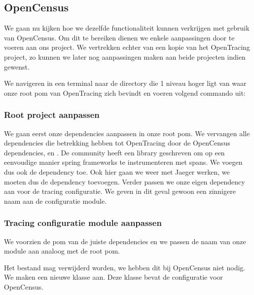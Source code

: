 \subsection{OpenCensus}
We gaan nu kijken hoe we dezelfde functionaliteit kunnen verkrijgen met gebruik van OpenCensus. Om dit te bereiken dienen we enkele aanpassingen door te voeren aan ons project. We vertrekken echter van een kopie van het OpenTracing project, zo kunnen we later nog aanpassingen maken aan beide projecten indien gewenst.

We navigeren in een terminal naar de directory die 1 niveau hoger ligt van waar onze root pom van OpenTracing zich bevindt en voeren volgend commando uit:
\begin{list}{}{}
	\item {}
\end{list}
\subsubsection{Root project aanpassen}
We gaan eerst onze dependencies aanpassen in onze root pom. We vervangen alle dependencies die betrekking hebben tot OpenTracing door de OpenCensus dependencies,  en . De community heeft een library geschreven om op een eenvoudige manier spring frameworks te instrumenteren met spans. We voegen dus ook de  dependency toe. Ook hier gaan we weer met Jaeger werken, we moeten dus de  dependency toevoegen. Verder passen we onze eigen dependency aan voor de tracing configuratie. We geven in dit geval gewoon een zinnigere naam aan de configuratie module.

\subsubsection{Tracing configuratie module aanpassen}
We voorzien de pom van de juiste dependencies en we passen de naam van onze module aan analoog met de root pom.

Het bestand  mag verwijderd worden, we hebben dit bij OpenCensus niet nodig. We maken een nieuwe klasse aan. Deze klasse bevat de configuratie voor OpenCensus. 

